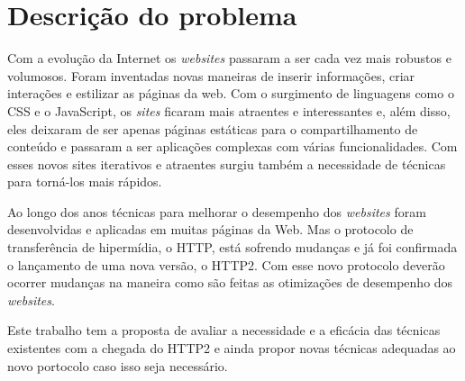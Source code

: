 %
%

\chapter{Descrição do problema}

Com a evolução da Internet os \textit{websites} passaram a ser cada vez mais robustos e volumosos. Foram inventadas novas maneiras de inserir informações, criar interações e estilizar as páginas da web. Com o surgimento de linguagens como o CSS e o JavaScript, os \textit{sites} ficaram mais atraentes e interessantes e, além disso, eles deixaram de ser apenas páginas estáticas para o compartilhamento de conteúdo e passaram a ser aplicações complexas com várias funcionalidades. Com esses novos sites iterativos e atraentes surgiu também a necessidade de técnicas para torná-los mais rápidos.

Ao longo dos anos técnicas para melhorar o desempenho dos \textit{websites} foram desenvolvidas e aplicadas em muitas páginas da Web. Mas o protocolo de transferência de hipermídia, o HTTP, está sofrendo mudanças e já foi confirmada o lançamento de uma nova versão, o HTTP2. Com esse novo protocolo deverão ocorrer mudanças na maneira como são feitas as otimizações de desempenho dos \textit{websites}.

Este trabalho tem a proposta de avaliar a necessidade e a eficácia das técnicas existentes com a chegada do HTTP2 e ainda propor novas técnicas adequadas ao novo portocolo caso isso seja necessário.
